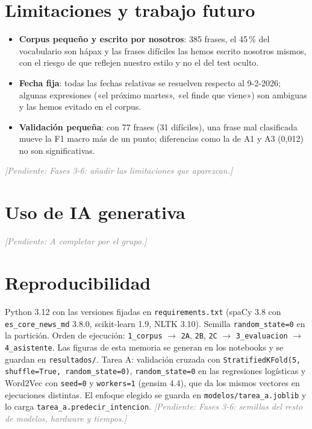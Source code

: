 \documentclass[10pt,a4paper]{article}
\newcommand{\cod}[1]{\texttt{#1}}
\newcommand{\pendiente}[1]{\textcolor{gray}{\textit{[Pendiente: #1]}}}
\begin{document}
\section{Limitaciones y trabajo futuro}\label{sec:limitaciones}

\begin{itemize}
  \item \textbf{Corpus pequeño y escrito por nosotros}: 385 frases, el 45\,\% del vocabulario son hápax y las frases difíciles las hemos escrito nosotros mismos, con el riesgo de que reflejen nuestro estilo y no el del test oculto.
  \item \textbf{Fecha fija}: todas las fechas relativas se resuelven respecto al 9-2-2026; algunas expresiones («el próximo martes», «el finde que viene») son ambiguas y las hemos evitado en el corpus.
  \item \textbf{Validación pequeña}: con 77 frases (31 difíciles), una frase mal clasificada mueve la F1 macro más de un punto; diferencias como la de A1 y A3 (0,012) no son significativas.
\end{itemize}
\pendiente{Fases 3-6: añadir las limitaciones que aparezcan.}

\section{Uso de IA generativa}\label{sec:ia}

\pendiente{A completar por el grupo.}

\section{Reproducibilidad}\label{sec:repro}

Python 3.12 con las versiones fijadas en \cod{requirements.txt} (spaCy 3.8 con \cod{es\_core\_news\_md} 3.8.0, scikit-learn 1.9, NLTK 3.10). Semilla \cod{random\_state=0} en la partición. Orden de ejecución: \cod{1\_corpus} $\rightarrow$ \cod{2A}, \cod{2B}, \cod{2C} $\rightarrow$ \cod{3\_evaluacion} $\rightarrow$ \cod{4\_asistente}. Las figuras de esta memoria se generan en los notebooks y se guardan en \cod{resultados/}.
Tarea A: validación cruzada con \cod{StratifiedKFold(5, shuffle=True, random\_state=0)}, \cod{random\_state=0} en las regresiones logísticas y Word2Vec con \cod{seed=0} y \cod{workers=1} (gensim 4.4), que da los mismos vectores en ejecuciones distintas. El enfoque elegido se guarda en \cod{modelos/tarea\_a.joblib} y lo carga \cod{tarea\_a.predecir\_intencion}.
\pendiente{Fases 3-6: semillas del resto de modelos, hardware y tiempos.}
\end{document}
